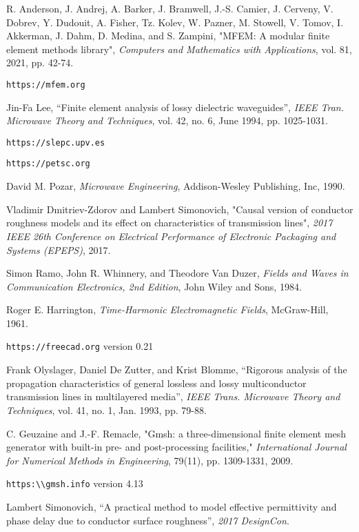 \documentclass[titlepage]{article}
\renewcommand\_{\textunderscore\linebreak[1]}
\begin{document}
\begin{thebibliography}{unsrt}

 R. Anderson, J. Andrej, A. Barker, J. Bramwell, J.-S. Camier, J. Cerveny, V. Dobrev, Y. Dudouit, A. Fisher, Tz. Kolev, W. Pazner, M. Stowell, V. Tomov, I. Akkerman, J. Dahm, D. Medina, and S. Zampini, "MFEM: A modular finite element methods library", \textit{Computers and Mathematics with Applications}, vol. 81, 2021, pp. 42-74.

 \verb+https://mfem.org+

 Jin-Fa Lee, “Finite element analysis of lossy dielectric waveguides”, \textit{IEEE Tran. Microwave Theory and Techniques}, vol. 42, no. 6, June 1994, pp. 1025-1031.

 \verb+https://slepc.upv.es+

 \verb+https://petsc.org+

 David M. Pozar, \textit{Microwave Engineering}, Addison-Wesley Publishing, Inc, 1990.

 Vladimir Dmitriev-Zdorov and Lambert Simonovich, "Causal version of conductor roughness models and its effect on characteristics of transmission lines", \textit{2017 IEEE 26th Conference on Electrical Performance of Electronic Packaging and Systems (EPEPS)}, 2017.

 Simon Ramo, John R. Whinnery, and Theodore Van Duzer, \textit{Fields and Waves in Communication Electronics, 2nd Edition}, John Wiley and Sons, 1984.

 Roger E. Harrington, \textit{Time-Harmonic Electromagnetic Fields}, McGraw-Hill, 1961.

 \verb+https://freecad.org+ version 0.21

 Frank Olyslager, Daniel De Zutter, and Krist Blomme, “Rigorous analysis of the propagation characteristics of general lossless and lossy multiconductor transmission lines in multilayered media”, \textit{IEEE Trans. Microwave Theory and Techniques}, vol. 41, no. 1, Jan. 1993, pp. 79-88.

 C. Geuzaine and J.-F. Remacle, "Gmsh: a three-dimensional finite element mesh generator with built-in pre- and post-processing facilities," \textit{International Journal for Numerical Methods in Engineering}, 79(11), pp. 1309-1331, 2009.

 \verb+https:\\gmsh.info+ version 4.13

 Lambert Simonovich, “A practical method to model effective permittivity and phase delay due to conductor surface roughness”, \textit{2017 DesignCon}.

\end{thebibliography}
\end{document}
